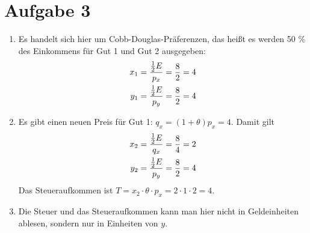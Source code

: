 \documentclass{article}
\begin{document}
	\section*{Aufgabe 3}
	\begin{enumerate}[label=(\alph*)]
		\item Es handelt sich hier um Cobb-Douglas-Präferenzen, das heißt es werden 50 \% des Einkommens für Gut 1 und Gut 2 ausgegeben:
		\begin{align}
			x_1 &= \frac{\frac{1}{2}E}{p_x} = \frac{8}{2} = 4 \notag \\
			y_1 &= \frac{\frac{1}{2}E}{p_y} = \frac{8}{2} = 4 \notag
		\end{align}
		\item Es gibt einen neuen Preis für Gut 1: $q_x=(1+\theta)p_x = 4$. Damit gilt
		\begin{align}
			x_2 &= \frac{\frac{1}{2}E}{q_x} = \frac{8}{4} = 2 \notag \\
			y_2 &= \frac{\frac{1}{2}E}{p_y} = \frac{8}{2} = 4 \notag
		\end{align}
		Das Steueraufkommen ist $T=x_2\cdot \theta\cdot p_x = 2\cdot 1\cdot 2=4$.
		\item Die Steuer und das Steueraufkommen kann man hier nicht in Geldeinheiten ablesen, sondern nur in Einheiten von $y$.
		\begin{center}
\end{center}
\end{enumerate}
\end{document}
